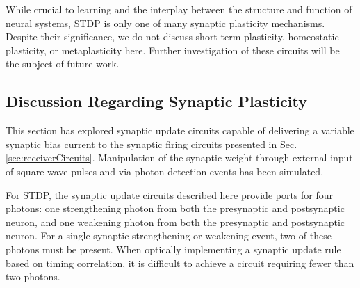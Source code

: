 \documentclass[aip,amsmath,amssymb,reprint,nofootinbib]{revtex4-1}
\begin{document}
While crucial to learning and the interplay between the structure and function of neural systems, STDP is only one of many synaptic plasticity mechanisms. Despite their significance, we do not discuss short-term plasticity, homeostatic plasticity, or metaplasticity here. Further investigation of these circuits will be the subject of future work.
	
\subsection{\label{sec:discussion_synapticPlasticity}Discussion Regarding Synaptic Plasticity}
This section has explored synaptic update circuits capable of delivering a variable synaptic bias current to the synaptic firing circuits presented in Sec.\,\ref{sec:receiverCircuits}. Manipulation of the synaptic weight through external input of square wave pulses and via photon detection events has been simulated. 

For STDP, the synaptic update circuits described here provide ports for four photons: one strengthening photon from both the pre\textendash synaptic and post\textendash synaptic neuron, and one weakening photon from both the pre\textendash synaptic and post\textendash synaptic neuron. For a single synaptic strengthening or weakening event, two of these photons must be present. When optically implementing a synaptic update rule based on timing correlation, it is difficult to achieve a circuit requiring fewer than two photons.
\end{document}
